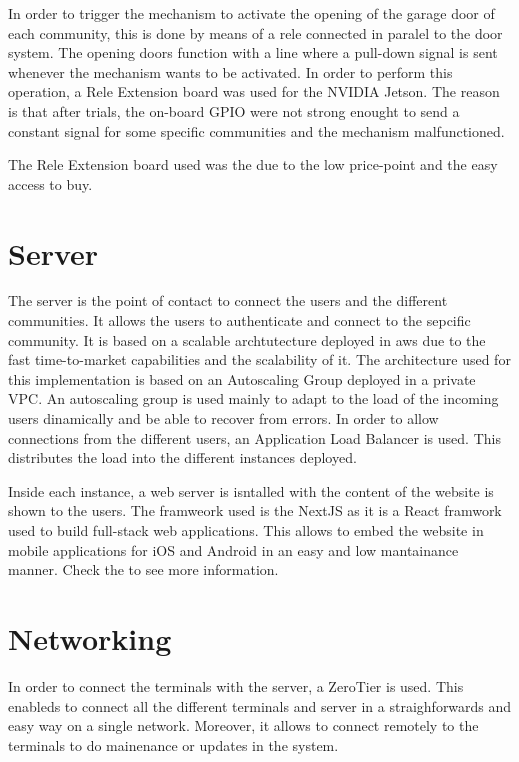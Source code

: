 In order to trigger the mechanism to activate the opening of the garage door of each community, this is done by means of a rele connected in paralel to the door system. The opening doors function with a line where a pull-down signal is sent whenever the mechanism wants to be activated. In order to perform this operation, a Rele Extension board was used for the NVIDIA Jetson. The reason is that after trials, the on-board GPIO were not strong enought to send a constant signal for some specific communities and the mechanism malfunctioned.

The Rele Extension board used was the  due to the low price-point and the easy access to buy.

\section{Server}

The server is the point of contact to connect the users and the different communities. It allows the users to authenticate and connect to the sepcific community. It is based on a scalable archtutecture deployed in \gls{aws} due to the fast time-to-market capabilities and the scalability of it. The architecture used for this implementation is based on an Autoscaling Group deployed in a private VPC. An autoscaling group is used mainly to adapt to the load of the incoming users dinamically and be able to recover from errors. In order to allow connections from the different users, an Application Load Balancer is used. This distributes the load into the different instances deployed.

Inside each instance, a web server is isntalled with the content of the website is shown to the users. The framweork used is the NextJS  as it is a React framwork used to build full-stack web applications. This allows to embed the website in mobile applications for iOS and Android in an easy and low mantainance manner. Check the  to see more information.

\section{Networking}

In order to connect the terminals with the server, a ZeroTier  is used. This enableds to connect all the different terminals and server in a straighforwards and easy way on a single network. Moreover, it allows to connect remotely to the terminals to do mainenance or updates in the system.

